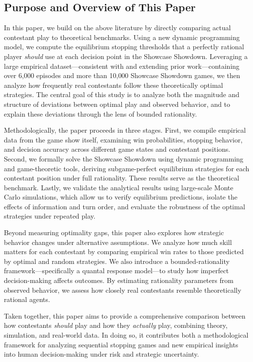 \documentclass[titlepage,12pt]{article}
\begin{document}
\subsection{Purpose and Overview of This Paper}

In this paper, we build on the above literature by directly comparing actual contestant play to theoretical benchmarks. Using a new dynamic programming model, we compute the equilibrium stopping thresholds that a perfectly rational player \emph{should} use at each decision point in the Showcase Showdown. Leveraging a large empirical dataset—consistent with and extending prior work—containing over 6{,}000 episodes and more than 10{,}000 Showcase Showdown games, we then analyze how frequently real contestants follow these theoretically optimal strategies. The central goal of this study is to analyze both the magnitude and structure of deviations between optimal play and observed behavior, and to explain these deviations through the lens of bounded rationality.

Methodologically, the paper proceeds in three stages. First, we compile empirical data from the game show itself, examining win probabilities, stopping behavior, and decision accuracy across different game states and contestant positions. Second, we formally solve the Showcase Showdown using dynamic programming and game-theoretic tools, deriving subgame-perfect equilibrium strategies for each contestant position under full rationality. These results serve as the theoretical benchmark. Lastly, we validate the analytical results using large-scale Monte Carlo simulations, which allow us to verify equilibrium predictions, isolate the effects of information and turn order, and evaluate the robustness of the optimal strategies under repeated play.

Beyond measuring optimality gaps, this paper also explores how strategic behavior changes under alternative assumptions. We analyze how much skill matters for each contestant by comparing empirical win rates to those predicted by optimal and random strategies. We also introduce a bounded-rationality framework—specifically a quantal response model—to study how imperfect decision-making affects outcomes. By estimating rationality parameters from observed behavior, we assess how closely real contestants resemble theoretically rational agents.

Taken together, this paper aims to provide a comprehensive comparison between how contestants \emph{should} play and how they \emph{actually} play, combining theory, simulation, and real-world data. In doing so, it contributes both a methodological framework for analyzing sequential stopping games and new empirical insights into human decision-making under risk and strategic uncertainty.
\end{document}
